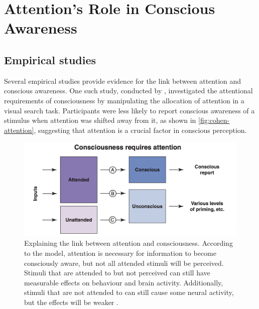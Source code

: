 \documentclass[10pt]{article}
\begin{document}
\begin{sloppypar}
  \section{Attention’s Role in Conscious Awareness}
  \label{sec:evidence}

  \subsection{Empirical studies}
  \label{sec:empirical}

  Several empirical studies provide evidence for the link between attention and conscious awareness. One such study, conducted by \cite{cohen_attentional_2012}, investigated the attentional requirements of consciousness by manipulating the allocation of attention in a visual search task. Participants were less likely to report conscious awareness of a stimulus when attention was shifted away from it, as shown in \autoref{fig:cohen-attention}, suggesting that attention is a crucial factor in conscious perception.

  \begin{figure}[ht]
    \centering
    \includegraphics[width=\textwidth]{figures/attention.png}
    \caption[Explaining the link between attention and consciousness. According to the model, attention is necessary for information to become consciously aware, but not all attended stimuli will be perceived. Stimuli that are attended to but not perceived can still have measurable effects on behaviour and brain activity. Additionally, stimuli that are not attended to can still cause some neural activity, but the effects will be weaker.]{Explaining the link between attention and consciousness. According to the model, attention is necessary for information to become consciously aware, but not all attended stimuli will be perceived. Stimuli that are attended to but not perceived can still have measurable effects on behaviour and brain activity. Additionally, stimuli that are not attended to can still cause some neural activity, but the effects will be weaker \citep{cohen_attentional_2012}.}
    \label{fig:cohen-attention}
  \end{figure}


\end{sloppypar}
\end{document}
